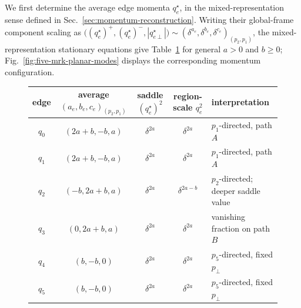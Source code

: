 \documentclass[a4paper,11pt]{article}
\begin{document}
We first determine the average edge momenta \(q_e^\star\), in the
mixed-representation sense defined in
Sec.~\ref{sec:momentum-reconstruction}.  Writing
their global-frame component scaling as
\(\bigl((q_e^\star)^+,(q_e^\star)^-,|q_{e\perp}^\star|\bigr)
\sim(\delta^{a_e},\delta^{b_e},\delta^{c_e})_{(p_2,p_1)}\), the
mixed-representation stationary equations give
Table~\ref{tab:five-mrk-planar-edge-flow} for general \(a>0\) and \(b\geq0\);
Fig.~\ref{fig:five-mrk-planar-modes} displays the corresponding momentum
configuration.
\begin{figure}[!t]
\centering
\begingroup
\small
\begin{tabular}{@{}c c c c l@{}}
\toprule
edge & average \((a_e,b_e,c_e)_{(p_2,p_1)}\) & saddle \((q_e^\star)^2\)
 & region-scale \(q_e^2\) & interpretation\\
\midrule
\(q_0\) & \((2a+b,-b,a)\) & \(\delta^{2a}\) & \(\delta^{2a}\) & \(p_1\)-directed, path \(A\)\\
\(q_1\) & \((2a+b,-b,a)\) & \(\delta^{2a}\) & \(\delta^{2a}\) & \(p_1\)-directed, path \(A\)\\
\(q_2\) & \((-b,2a+b,a)\) & \(\delta^{2a}\) & \(\delta^{2a-b}\) & \(p_2\)-directed; deeper saddle value\\
\(q_3\) & \((0,2a+b,a)\) & \(\delta^{2a}\) & \(\delta^{2a}\) & vanishing fraction on path \(B\)\\
\(q_4\) & \((b,-b,0)\) & \(\delta^{2a}\) & \(\delta^{2a}\) & \(p_5\)-directed, fixed \(p_\perp\)\\
\(q_5\) & \((b,-b,0)\) & \(\delta^{2a}\) & \(\delta^{2a}\) & \(p_5\)-directed, fixed \(p_\perp\)\\
\bottomrule
\end{tabular}
\label{tab:five-mrk-planar-edge-flow}
\endgroup
\vspace{1em}
\end{figure}
\end{document}

